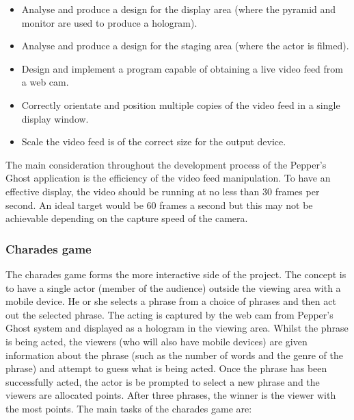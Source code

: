 \begin{itemize}
	\item Analyse and produce a design for the display area (where the pyramid and monitor are used to produce a hologram).
	
	\item Analyse and produce a design for the staging area (where the actor is filmed).
	
	\item Design and implement a program capable of obtaining a live video feed from a web cam.
	
	\item Correctly orientate and position multiple copies of the video feed in a single display window.

	\item Scale the video feed is of the correct size for the output device.

\end{itemize}

The main consideration throughout the development process of the Pepper's Ghost application is the efficiency of the video feed manipulation. To have an effective display, the video should be running at no less than 30 frames per second. An ideal target would be 60 frames a second but this may not be achievable depending on the capture speed of the camera.
 
\subsubsection{Charades game}
The charades game forms the more interactive side of the project. The concept is to have a single actor (member of the audience) outside the viewing area with a mobile device. He or she selects a phrase from a choice of phrases and then act out the selected phrase. The acting is captured by the web cam from Pepper's Ghost system and displayed as a hologram in the viewing area. Whilst the phrase is being acted, the viewers (who will also have mobile devices) are given information about the phrase (such as the number of words and the genre of the phrase) and attempt to guess what is being acted. Once the phrase has been successfully acted, the actor is be prompted to select a new phrase and the viewers are allocated points. After three phrases, the winner is the viewer with the most points. The main tasks of the charades game are:

